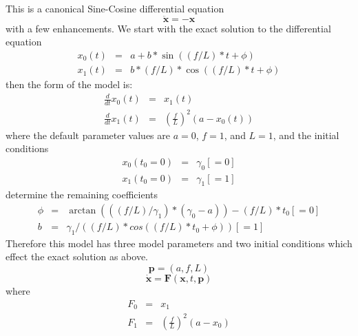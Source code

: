 This is a canonical Sine-Cosine differential equation
\[
\mathbf{\ddot{x}}=-\mathbf{x}
\]
with a few enhancements. We start with the exact solution to the differential
equation 
\begin{eqnarray*}
x_{0}(t) & = & a+b*\sin((f/L)*t+\phi)\\
x_{1}(t) & = & b*(f/L)*\cos((f/L)*t+\phi)
\end{eqnarray*}
then the form of the model is: 
\begin{eqnarray*}
\frac{d}{dt}x_{0}(t) & = & x_{1}(t)\\
\frac{d}{dt}x_{1}(t) & = & \left(\frac{f}{L}\right)^{2}(a-x_{0}(t))
\end{eqnarray*}
where the default parameter values are $a=0$, $f=1$, and $L=1$,
and the initial conditions
\begin{eqnarray*}
x_{0}(t_{0}=0) & = & \gamma_{0}[=0]\\
x_{1}(t_{0}=0) & = & \gamma_{1}[=1]
\end{eqnarray*}
determine the remaining coefficients
\begin{eqnarray*}
\phi & = & \arctan(((f/L)/\gamma_{1})*(\gamma_{0}-a))-(f/L)*t_{0}[=0]\\
b & = & \gamma_{1}/((f/L)*cos((f/L)*t_{0}+\phi))[=1]
\end{eqnarray*}
Therefore this model has three model parameters and two initial conditions
which effect the exact solution as above. 
\[
\mathbf{p}=(a,f,L)
\]
\[
\dot{\mathbf{x}}=\mathbf{F}(\mathbf{x},t,\mathbf{p})
\]
where
\begin{eqnarray*}
F_{0} & = & x_{1}\\
F_{1} & = & \left(\frac{f}{L}\right)^{2}(a-x_{0})
\end{eqnarray*}


